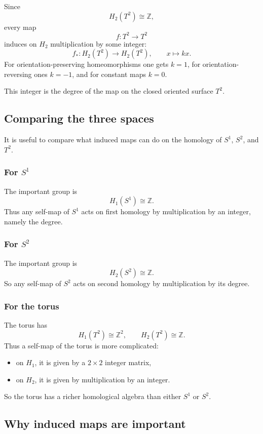 \documentclass[12pt,a4paper]{article}
\theoremstyle{notespace}
\begin{document}
Since
\[
H_2(T^2)\cong \mathbb{Z},
\]
every map
\[
f:T^2\to T^2
\]
induces on \(H_2\) multiplication by some integer:
\[
f_*:H_2(T^2)\to H_2(T^2),
\qquad
x\mapsto kx.
\]
For orientation-preserving homeomorphisms one gets \(k=1\), for orientation-reversing ones \(k=-1\), and for constant maps \(k=0\).

This integer is the degree of the map on the closed oriented surface \(T^2\).

\subsection{Comparing the three spaces}

It is useful to compare what induced maps can do on the homology of \(S^1\), \(S^2\), and \(T^2\).

\subsubsection{For \texorpdfstring{$S^1$}{S1}}

The important group is
\[
H_1(S^1)\cong \mathbb{Z}.
\]
Thus any self-map of \(S^1\) acts on first homology by multiplication by an integer, namely the degree.

\subsubsection{For \texorpdfstring{$S^2$}{S2}}

The important group is
\[
H_2(S^2)\cong \mathbb{Z}.
\]
So any self-map of \(S^2\) acts on second homology by multiplication by its degree.

\subsubsection{For the torus}

The torus has
\[
H_1(T^2)\cong \mathbb{Z}^2,
\qquad
H_2(T^2)\cong \mathbb{Z}.
\]
Thus a self-map of the torus is more complicated:
\begin{itemize}
	\item on \(H_1\), it is given by a \(2\times 2\) integer matrix,
	\item on \(H_2\), it is given by multiplication by an integer.
\end{itemize}

So the torus has a richer homological algebra than either \(S^1\) or \(S^2\).

\subsection{Why induced maps are important}
\end{document}
